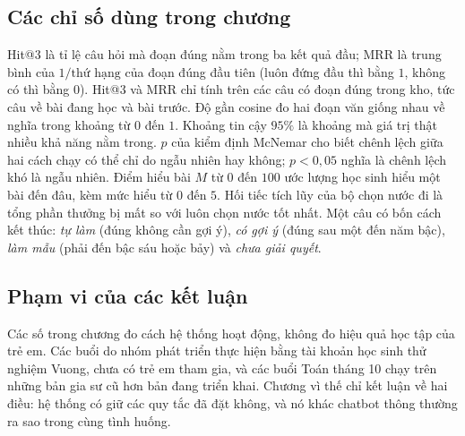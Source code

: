 \subsection{Các chỉ số dùng trong chương}
Hit@3 là tỉ lệ câu hỏi mà đoạn đúng nằm trong ba kết quả đầu; MRR là trung bình của $1/\text{thứ hạng}$ của đoạn đúng đầu tiên (luôn đứng đầu thì bằng $1$, không có thì bằng $0$). Hit@3 và MRR chỉ tính trên các câu có đoạn đúng trong kho, tức câu về bài đang học và bài trước. Độ gần cosine đo hai đoạn văn giống nhau về nghĩa trong khoảng từ $0$ đến $1$. Khoảng tin cậy $95\%$ là khoảng mà giá trị thật nhiều khả năng nằm trong. $p$ của kiểm định McNemar cho biết chênh lệch giữa hai cách chạy có thể chỉ do ngẫu nhiên hay không; $p<0{,}05$ nghĩa là chênh lệch khó là ngẫu nhiên. Điểm hiểu bài $M$ từ $0$ đến $100$ ước lượng học sinh hiểu một bài đến đâu, kèm mức hiểu từ $0$ đến $5$. Hối tiếc tích lũy của bộ chọn nước đi là tổng phần thưởng bị mất so với luôn chọn nước tốt nhất. Một câu có bốn cách kết thúc: \emph{tự làm} (đúng không cần gợi ý), \emph{có gợi ý} (đúng sau một đến năm bậc), \emph{làm mẫu} (phải đến bậc sáu hoặc bảy) và \emph{chưa giải quyết}.

\subsection{Phạm vi của các kết luận}
Các số trong chương đo cách hệ thống hoạt động, không đo hiệu quả học tập của trẻ em. Các buổi do nhóm phát triển thực hiện bằng tài khoản học sinh thử nghiệm Vuong, chưa có trẻ em tham gia, và các buổi Toán tháng 10 chạy trên những bản gia sư cũ hơn bản đang triển khai. Chương vì thế chỉ kết luận về hai điều: hệ thống có giữ các quy tắc đã đặt không, và nó khác chatbot thông thường ra sao trong cùng tình huống.
